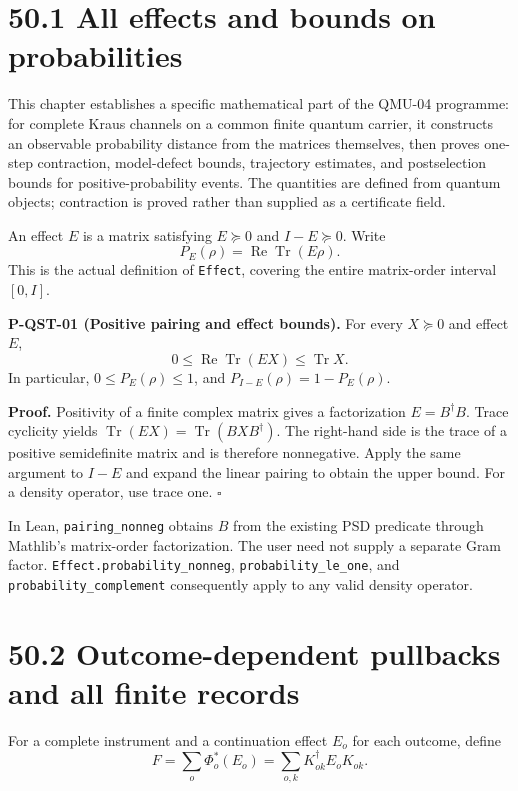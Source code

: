\documentclass[
  11pt,
  oneside]{book}
\begin{document}
\section{50.1 All effects and bounds on probabilities}

This chapter establishes a specific mathematical part of the QMU-04
programme: for complete Kraus channels on a common finite quantum
carrier, it constructs an observable probability distance from the
matrices themselves, then proves one-step contraction, model-defect
bounds, trajectory estimates, and postselection bounds for
positive-probability events. The quantities are defined from quantum
objects; contraction is proved rather than supplied as a certificate
field.

An effect \(E\) is a matrix satisfying \(E\succeq0\) and
\(I-E\succeq0\). Write \[
P_E(\rho)=\operatorname{Re}\operatorname{Tr}(E\rho).
\] This is the actual definition of \texttt{Effect}, covering the entire
matrix-order interval \([0,I]\).

\label{p-qst-01}{}

\textbf{P-QST-01 (Positive pairing and effect bounds).} For every
\(X\succeq0\) and effect \(E\), \[
0\le\operatorname{Re}\operatorname{Tr}(EX)\le\operatorname{Tr}X.
\] In particular, \(0\le P_E(\rho)\le1\), and
\(P_{I-E}(\rho)=1-P_E(\rho)\).

\textbf{Proof.} Positivity of a finite complex matrix gives a
factorization \(E=B^\dagger B\). Trace cyclicity yields
\(\operatorname{Tr}(EX)=\operatorname{Tr}(BXB^\dagger)\). The right-hand
side is the trace of a positive semidefinite matrix and is therefore
nonnegative. Apply the same argument to \(I-E\) and expand the linear
pairing to obtain the upper bound. For a density operator, use trace
one. \(\square\)

In Lean, \texttt{pairing\_\allowbreak nonneg} obtains \(B\) from the existing PSD
predicate through Mathlib's matrix-order factorization. The user need
not supply a separate Gram factor. \texttt{Effect.\allowbreak probability\_\allowbreak nonneg},
\texttt{probability\_\allowbreak le\_\allowbreak one}, and \texttt{probability\_\allowbreak complement}
consequently apply to any valid density operator.

\section{50.2 Outcome-dependent pullbacks and all finite records}

For a complete instrument and a continuation effect \(E_o\) for each
outcome, define \[
F=\sum_o\Phi_o^*(E_o)=\sum_{o,k}K_{ok}^{\dagger}E_oK_{ok}.
\]
\end{document}
